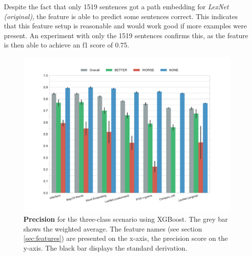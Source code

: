 Despite the fact that only 1519 sentences got a path embedding for \emph{LexNet (original)}, the feature is able to predict some sentences correct. This indicates that this feature setup is reasonable and would work good if more examples were present. An experiment with only the 1519 sentences confirms this, as the feature is then able to achieve an f1 score of 0.75.\newline


\begin{figure}[htbp]
         \caption{\textbf{Precision} for the three-class scenario using XGBoost. The grey bar shows the weighted average. The feature names (see section \ref{sec:features}) are presented on the x-axis, the precision score on the y-axis. The black bar displays the standard derivation.} 
    \label{fig:3_precision}
 \centering
	\includegraphics[width=1\textwidth]{images/experiments/precision-False}
\end{figure}


